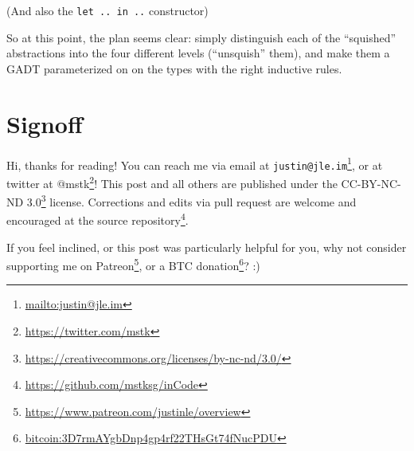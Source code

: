 \documentclass[]{article}
\renewcommand{\href}[2]{#2\footnote{\url{#1}}}
\begin{document}
(And also the \texttt{let\ ..\ in\ ..} constructor)

So at this point, the plan seems clear: simply distinguish each of the
``squished'' abstractions into the four different levels (``unsquish'' them),
and make them a GADT parameterized on on the types with the right inductive
rules.

\hypertarget{signoff}{%
\section{Signoff}\label{signoff}}

Hi, thanks for reading! You can reach me via email at
\href{mailto:justin@jle.im}{\nolinkurl{justin@jle.im}}, or at twitter at
\href{https://twitter.com/mstk}{@mstk}! This post and all others are published
under the \href{https://creativecommons.org/licenses/by-nc-nd/3.0/}{CC-BY-NC-ND
3.0} license. Corrections and edits via pull request are welcome and encouraged
at \href{https://github.com/mstksg/inCode}{the source repository}.

If you feel inclined, or this post was particularly helpful for you, why not
consider \href{https://www.patreon.com/justinle/overview}{supporting me on
Patreon}, or a \href{bitcoin:3D7rmAYgbDnp4gp4rf22THsGt74fNucPDU}{BTC donation}?
:)
\end{document}
